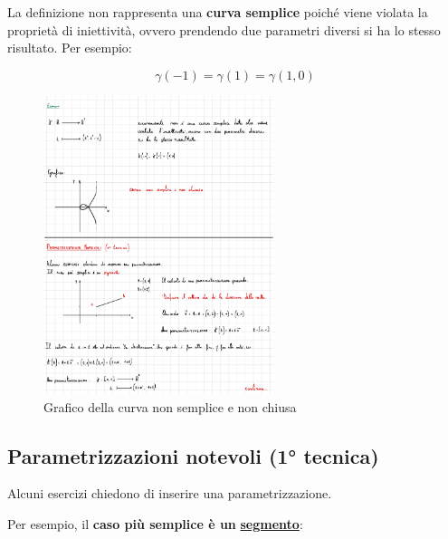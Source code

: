 \documentclass[a4paper]{article}
\begin{document}
	\noindent
	La definizione non rappresenta una \textbf{curva semplice} poiché viene violata la proprietà di iniettività, ovvero prendendo due parametri diversi si ha lo stesso risultato. Per esempio:
	
	\begin{equation*}
		\gamma\left(-1\right) = \gamma\left(1\right) = \gamma\left(1,0\right)
	\end{equation*}

	\begin{figure}[!htp]
		\centering
		\includegraphics[width=0.6\textwidth]{img/nessuna_curva.pdf}
		\caption{Grafico della curva non semplice e non chiusa}
	\end{figure}

	\newpage
	
	\subsection{Parametrizzazioni notevoli (1° tecnica)}
	
	Alcuni esercizi chiedono di inserire una parametrizzazione.\newline
	
	\noindent
	Per esempio, il \textbf{caso più semplice è un} \textcolor{Red3}{\textbf{\underline{segmento}}}:
	
\end{document}

